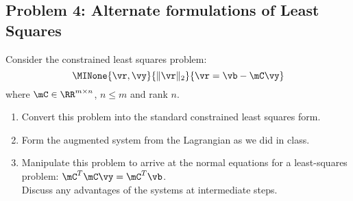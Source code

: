 \documentclass[]{article}
\begin{document}
\hypertarget{problem-4-alternate-formulations-of-least-squares}{%
\subsection{Problem 4: Alternate formulations of Least
Squares}\label{problem-4-alternate-formulations-of-least-squares}}

Consider the constrained least squares problem:
\[ \MINone{\vr,\vy}{ \| \vr \|_2 } { \vr = \vb - \mC\vy } \] where
\(\mC \in \RR^{m \times n}\), \(n \le m\) and rank \(n\).

\begin{enumerate}
\def\labelenumi{\arabic{enumi}.}
\item
  Convert this problem into the standard constrained least squares form.
\item
  Form the augmented system from the Lagrangian as we did in class.
\item
  Manipulate this problem to arrive at the normal equations for a
  least-squares problem: \(\mC^T \mC \vy = \mC^T \vb\).\\
  Discuss any advantages of the systems at intermediate steps.
\end{enumerate}
\end{document}
